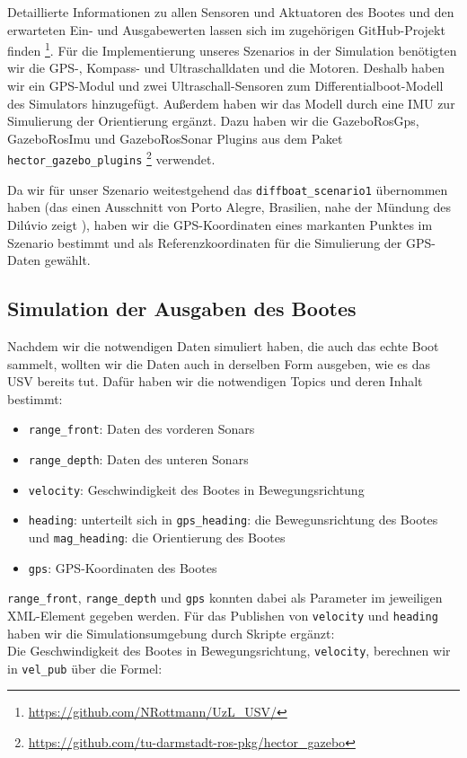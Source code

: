 \documentclass[11pt]{article}
\begin{document}
Detaillierte Informationen zu allen Sensoren und Aktuatoren des Bootes und den erwarteten Ein- und Ausgabewerten lassen sich im zugehörigen GitHub-Projekt finden \footnote{\url{https://github.com/NRottmann/UzL_USV/}}.
Für die Implementierung unseres Szenarios in der Simulation benötigten wir die GPS-, Kompass- und Ultraschalldaten und die Motoren. Deshalb haben wir ein GPS-Modul und zwei Ultraschall-Sensoren zum Differentialboot-Modell des Simulators hinzugefügt. Außerdem haben wir das Modell durch eine IMU zur Simulierung der Orientierung ergänzt. Dazu haben wir die GazeboRosGps, GazeboRosImu und GazeboRosSonar Plugins aus dem Paket \texttt{hector\_gazebo\_plugins}  \footnote{\url{https://github.com/tu-darmstadt-ros-pkg/hector_gazebo}} verwendet.


Da wir für unser Szenario weitestgehend das \texttt{diffboat\_scenario1} übernommen haben (das einen Ausschnitt von Porto Alegre, Brasilien, nahe der Mündung des Dilúvio zeigt \cite{paravisi2019}), haben wir die GPS-Koordinaten eines markanten Punktes im Szenario bestimmt und als Referenzkoordinaten für die Simulierung der GPS-Daten gewählt.

\subsection{Simulation der Ausgaben des Bootes}

Nachdem wir die notwendigen Daten simuliert haben, die auch das echte Boot sammelt, wollten wir die Daten auch in derselben Form ausgeben, wie es das USV bereits tut. Dafür haben wir die notwendigen Topics und deren Inhalt bestimmt:

\begin{itemize}
	\item \texttt{range\_front}: Daten des vorderen Sonars
	\item \texttt{range\_depth}: Daten des unteren Sonars
	\item \texttt{velocity}: Geschwindigkeit des Bootes in Bewegungsrichtung
	\item \texttt{heading}: unterteilt sich in \texttt{gps\_heading}: die Bewegunsrichtung des Bootes und \texttt{mag\_heading}: die Orientierung des Bootes
	\item \texttt{gps}: GPS-Koordinaten des Bootes
\end{itemize}
\texttt{range\_front}, \texttt{range\_depth} und \texttt{gps} konnten dabei als Parameter im jeweiligen XML-Element gegeben werden. Für das Publishen von \texttt{velocity} und \texttt{heading} haben wir die Simulationsumgebung durch Skripte ergänzt:\\
Die Geschwindigkeit des Bootes in Bewegungsrichtung, \texttt{velocity}, berechnen wir in \texttt{vel\_pub} über die Formel:
\end{document}
